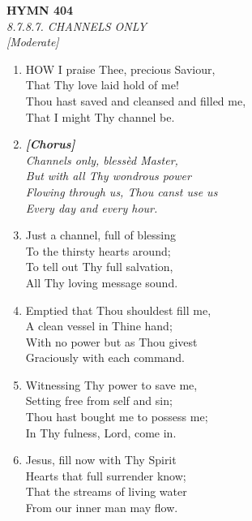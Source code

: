\documentclass[11pt,a4paper]{article}
\begin{document}
\newpage
\begin{center}
    {\Large \textbf{HYMN 404}}
    \\
    \textit{8.7.8.7. CHANNELS ONLY}
    \\
    \textit{\small [Moderate]}
\end{center}
\vspace{1em}

\begin{enumerate}
    \item HOW I praise Thee, precious Saviour, \\
        That Thy love laid hold of me! \\
        Thou hast saved and cleansed and filled me, \\
        That I might Thy channel be.

    \item[] \vspace{0.4em}
    \textbf{\textit{[Chorus]}} \\
    \textit{Channels only, bless\`ed Master,} \\
    \textit{But with all Thy wondrous power} \\
    \textit{Flowing through us, Thou canst use us} \\
    \textit{Every day and every hour.}
    \vspace{0.4em}

    \item Just a channel, full of blessing \\
        To the thirsty hearts around; \\
        To tell out Thy full salvation, \\
        All Thy loving message sound.

    \item Emptied that Thou shouldest fill me, \\
        A clean vessel in Thine hand; \\
        With no power but as Thou givest \\
        Graciously with each command.

    \item Witnessing Thy power to save me, \\
        Setting free from self and sin; \\
        Thou hast bought me to possess me; \\
        In Thy fulness, Lord, come in.

    \item Jesus, fill now with Thy Spirit \\
        Hearts that full surrender know; \\
        That the streams of living water \\
        From our inner man may flow.

\end{enumerate}
\end{document}
